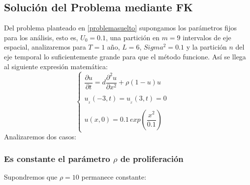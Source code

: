 \subsection{Solución del Problema mediante FK}
Del problema planteado en \ref{problemasuelto} supongamos los parámetros fijos para los análisis, esto es, $U_0=0\mbox{.}1$, una partición en $m=9$ intervalos de eje espacial, analizaremos para $T= 1$ año, $L=6$, $Sigma^2=0.1$ y la partición $n$ del eje temporal lo suficientemente grande para que el método funcione. Así se llega al siguiente expresión matemática:
\[
\left\{ \begin{array}{lcl}
	\dfrac{\partial u}{\partial t}=d\dfrac{\partial^{2}u}{\partial x^{2}}+\rho(1-u)u     &                      &              \\
	&                      &              \\
	u_{_{x}}(-3,t)=u_{_{x}}(3,t)=0 &                      &     \\
	&                      &              \\
	u(x,0)=0\mbox{.}1\,exp\left(\dfrac{x^{2}}{0.1}\right)                   
\end{array}
\right.
\]
Analizaremos dos casos:
\subsubsection{Es constante el parámetro $\rho$ de proliferación}
Supondremos que $\rho=10$ permanece constante:


